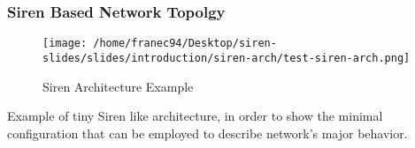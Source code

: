 



\begin{frame}
\frametitle{Siren Based Network Topolgy}
\begin{figure}
\texttt{[image: /home/franec94/Desktop/siren-slides/slides/introduction/siren-arch/test-siren-arch.png]}
\caption{Siren Architecture Example}
\end{figure}
Example of tiny Siren like architecture, in order to show the minimal configuration that can be employed to describe network's major behavior.
\end{frame}

